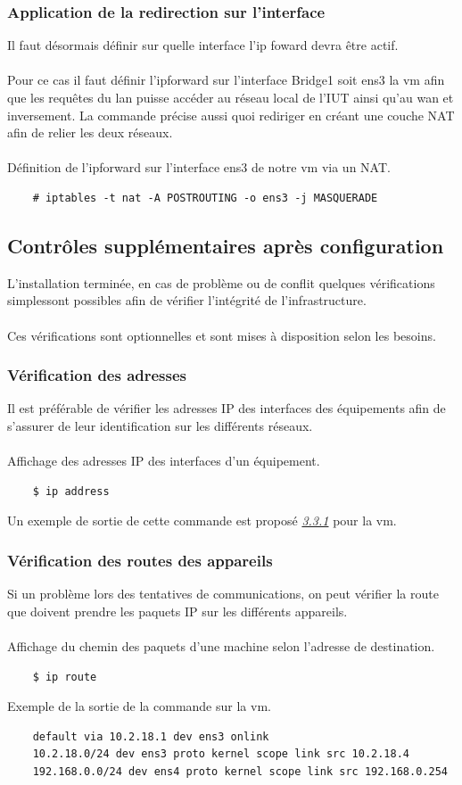 \documentclass[a4paper]{article}
\begin{document}
\subsubsection{Application de la redirection sur l'interface}
Il faut désormais définir sur quelle interface l'ip foward devra être actif.\\\\Pour ce cas il faut définir l'\gls{ipforward} sur l'interface Bridge1 soit ens3 la \acrshort{vm} afin que les requêtes du \gls{lan} puisse accéder au réseau local de l'IUT ainsi qu'au \gls{wan} et inversement. La commande précise aussi quoi rediriger en créant une couche NAT afin de relier les deux réseaux.\\\\Définition de l'\gls{ipforward} sur l'interface ens3 de notre \acrshort{vm} via un NAT.
\begin{lstlisting}
    # iptables -t nat -A POSTROUTING -o ens3 -j MASQUERADE
\end{lstlisting}
\subsection{Contrôles supplémentaires après configuration}
\label{sec:ici}
L'installation terminée, en cas de problème ou de conflit quelques vérifications simplessont possibles afin de vérifier l'intégrité de l'infrastructure.\\\\Ces vérifications sont optionnelles et sont mises à disposition selon les besoins.
\subsubsection{Vérification des adresses}
Il est préférable de vérifier les adresses IP des interfaces des équipements afin de s'assurer de leur identification sur les différents réseaux.\\\\Affichage des adresses IP des interfaces d'un équipement.
\begin{lstlisting}
    $ ip address
\end{lstlisting}
Un exemple de sortie de cette commande est proposé \hyperref[sec:secip]{\textit{3.3.1}} pour la \acrshort{vm}.
\subsubsection{Vérification des routes des appareils}
Si un problème lors des tentatives de communications, on peut vérifier la route que doivent prendre les paquets IP sur les différents appareils.\\\\Affichage du chemin des paquets d'une machine selon l'adresse de destination.
\begin{lstlisting}
    $ ip route
\end{lstlisting}
Exemple de la sortie de la commande sur la \acrshort{vm}.
\begin{lstlisting}
    default via 10.2.18.1 dev ens3 onlink 
    10.2.18.0/24 dev ens3 proto kernel scope link src 10.2.18.4 
    192.168.0.0/24 dev ens4 proto kernel scope link src 192.168.0.254 
\end{lstlisting}
\end{document}
